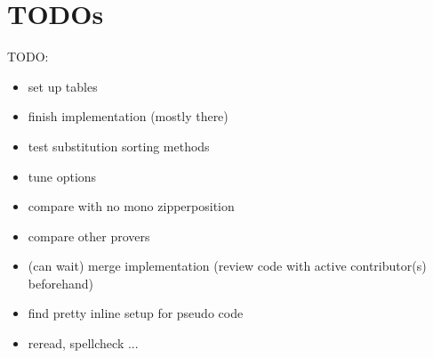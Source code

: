 \documentclass{article}
\begin{document}
\section{TODOs}

TODO:
   \begin{itemize}

      \item set up tables
      \item finish implementation (mostly there)
      \item test substitution sorting methods
      \item tune options
      \item compare with no mono zipperposition
      \item compare other provers
      \item (can wait) merge implementation (review code with active contributor(s) beforehand)
      \item find pretty inline setup for pseudo code
      \item reread, spellcheck ...
    \end{itemize}
\end{document}
